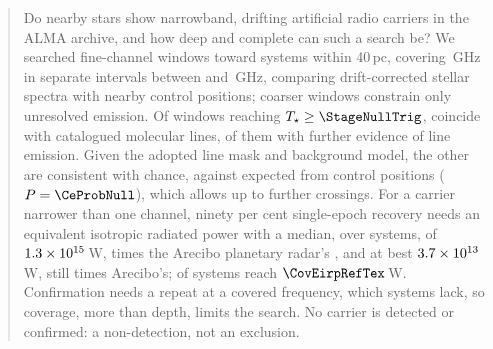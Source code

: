 \begin{abstract}
Do nearby stars show narrowband, drifting artificial radio carriers in the
ALMA archive, and how deep and complete can such a search be? We searched
\NWinA{} fine-channel windows toward \NSysClassA{} systems within 40\,pc,
covering \CvUnionA\,GHz in \CovNIslands{} separate intervals between
\SurvFreqLoA{} and \SurvFreqHiA\,GHz, comparing drift-corrected stellar spectra
with nearby control positions; \NWinB{} coarser windows constrain
only unresolved emission. Of \CsNCross{} windows reaching
$T_\star\geq\StageNullTrig$, \MkNCoinc{} coincide with catalogued molecular
lines, \LnAttrSupp{} of them with further evidence of line emission. Given the
adopted line mask and background model, the other
\CeObs{} are consistent with chance, against \CeExp{} expected
from control positions ($P=\CeProbNull$), which allows up to \CeAddLim{} further crossings. For a
carrier narrower than one channel, ninety per cent single-epoch recovery
needs an equivalent isotropic radiated power with a median, over systems, of
$\EirpNinetySysMedA$\,W, \AroMedMult{} times the Arecibo planetary
radar's \citep{EarthDetectingEarth2025}, and at best
$\EirpNinetySysLoA$\,W, still \AroDeepMult{} times Arecibo's; \NSysEfifteen{}
of \NSysALimSum{} systems reach $\CovEirpRefTex$\,W. Confirmation needs a
repeat at a covered frequency, which \ZcNoRepSys{} systems lack, so coverage,
more than depth, limits the search. No carrier is detected or confirmed: a
non-detection, not an exclusion.
\end{abstract}


